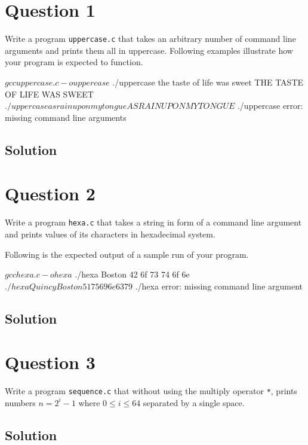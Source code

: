 \documentclass[12pt,letterpaper,twoside]{article}
\begin{document}


\section*{Question 1}

Write a program \texttt{uppercase.c} that takes an arbitrary number of command line arguments and prints them all in uppercase.
Following examples illustrate how your program is expected to function.

\begin{terminal}
$ gcc uppercase.c -o uppercase
$ ./uppercase the taste of life was sweet
THE TASTE OF LIFE WAS SWEET
$ ./uppercase as rain upon my tongue
AS RAIN UPON MY TONGUE
$ ./uppercase
error: missing command line arguments
\end{terminal}

\subsection*{Solution}

\lstset{language=c,tabsize=4}


\section*{Question 2}

Write a program \texttt{hexa.c} that takes a string in form of a command line argument and prints values of its characters in hexadecimal system.

Following is the expected output of a sample run of your program.

\begin{terminal}
$ gcc hexa.c -o hexa
$ ./hexa Boston
42 6f 73 74 6f 6e
$ ./hexa Quincy Boston
51 75 69 6e 63 79
$ ./hexa
error: missing command line argument
\end{terminal}

\subsection*{Solution}

\lstset{language=c,tabsize=4}


\section*{Question 3}

Write a program \texttt{sequence.c} that without using the multiply operator \texttt{*}, prints numbers $n = 2^{i}-1$ where $0 \leq i \leq 64$ separated by a single space.

\subsection*{Solution}

\lstset{language=c,tabsize=4}

\end{document}
